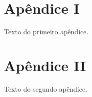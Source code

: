 \begin{apendicesenv}

\partapendices

\chapter{Apêndice I}

Texto do primeiro apêndice.

\chapter{Apêndice II}

Texto do segundo apêndice.

\end{apendicesenv}